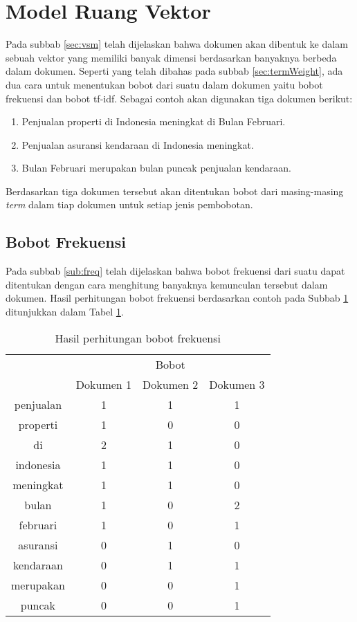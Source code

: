 \section{Model Ruang Vektor}
\label{sec:analysis:vsm}
Pada subbab \ref{sec:vsm} telah dijelaskan bahwa dokumen akan dibentuk ke dalam sebuah vektor yang memiliki banyak dimensi berdasarkan banyaknya \term berbeda dalam dokumen. Seperti yang telah dibahas pada subbab \ref{sec:termWeight}, ada dua cara untuk menentukan bobot dari suatu \term dalam dokumen yaitu bobot frekuensi dan bobot tf-idf. Sebagai contoh akan digunakan tiga dokumen berikut:

\begin{enumerate}
	\item Penjualan properti di Indonesia meningkat di Bulan Februari.
	\item Penjualan asuransi kendaraan di Indonesia meningkat.
	\item Bulan Februari merupakan bulan puncak penjualan kendaraan.
\end{enumerate}

Berdasarkan tiga dokumen tersebut akan ditentukan bobot dari masing-masing \textit{term} dalam tiap dokumen untuk setiap jenis pembobotan.

\subsection{Bobot Frekuensi}
Pada subbab \ref{sub:freq} telah dijelaskan bahwa bobot frekuensi dari suatu \term dapat ditentukan dengan cara menghitung banyaknya kemunculan \term tersebut dalam dokumen. Hasil perhitungan bobot frekuensi berdasarkan contoh pada Subbab \ref{sec:analysis:vsm} ditunjukkan dalam Tabel \ref{tbl:freq}.

\begin{table}[h]
	\centering
	\caption{Hasil perhitungan bobot frekuensi}
	\begin{tabular}{|c|c|c|c|} \hline
		\multirow{2}{*}{\Term} & \multicolumn{3}{c|}{Bobot} \\ \cline{2-4}
		& Dokumen 1 & Dokumen 2 & Dokumen 3 \\ \hline 
        penjualan & 1 & 1 & 1 \\ \hline
        properti & 1 & 0 & 0 \\ \hline
        di & 2 & 1 & 0 \\ \hline
        indonesia & 1 & 1 & 0 \\ \hline
        meningkat & 1 & 1 & 0 \\ \hline
        bulan & 1 & 0 & 2 \\ \hline
        februari & 1 & 0 & 1 \\ \hline
        asuransi & 0 & 1 & 0 \\ \hline
        kendaraan & 0 & 1 & 1 \\ \hline
        merupakan & 0 & 0 & 1 \\ \hline
        puncak & 0 & 0 & 1 \\ \hline
	\end{tabular}
	\label{tbl:freq}
\end{table}

